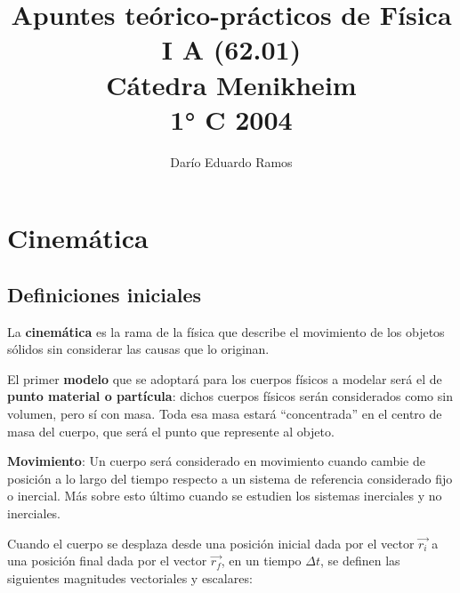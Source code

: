 \documentclass{article}
\title{Apuntes teórico-prácticos de Física I A (62.01) \\ Cátedra Menikheim \\ 1° C 2004}
\author{Darío Eduardo Ramos}
\begin{document}
\maketitle

\tableofcontents{}
\newpage

\section{Cinemática}

\subsection{Definiciones iniciales}

La \textbf{cinemática} es la rama de la física que describe el movimiento de los objetos sólidos sin considerar las causas que lo originan. 

El primer \textbf{modelo} que se adoptará para los cuerpos físicos a modelar será el de \textbf{punto material o partícula}: dichos cuerpos físicos serán considerados como sin volumen, pero sí con masa. Toda esa masa estará ``concentrada'' en el centro de masa del cuerpo, que será el punto que represente al objeto.

\textbf{Movimiento}: Un cuerpo será considerado en movimiento cuando cambie de posición a lo largo del tiempo respecto a un sistema de referencia considerado fijo o inercial. Más sobre esto último cuando se estudien los sistemas inerciales y no inerciales.

Cuando el cuerpo se desplaza desde una posición inicial dada por el vector $\overrightarrow{ r_i }$ a una posición final dada por el vector $\overrightarrow{ r_f }$, en un tiempo $\Delta t$, se definen las siguientes magnitudes vectoriales y escalares:
\end{document}
